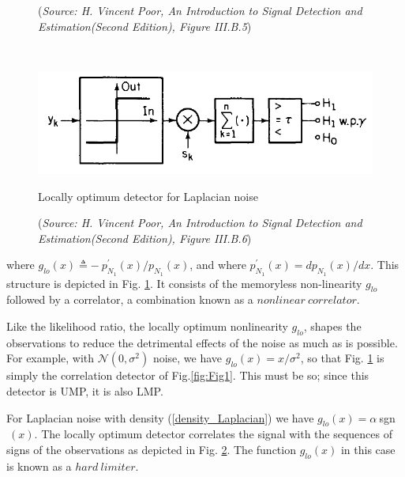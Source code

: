 \documentclass[a4paper,english,12pt]{article}
\begin{document}
\begin{exmp}
\begin{figure}[h]
\caption*{\footnotesize(\textit{Source: H. Vincent Poor, An Introduction to Signal Detection and Estimation(Second Edition), Figure	 III.B.5})}
\label{fig:Fig4}
\end{figure}\
\begin{figure}[h]
\centering
\captionsetup{justification=centering}
\includegraphics[width=0.8\linewidth]{Figures/lec10Fig5}
\caption{Locally optimum detector for Laplacian noise}
\caption*{\footnotesize(\textit{Source: H. Vincent Poor, An Introduction to Signal Detection and Estimation(Second Edition), Figure	 III.B.6})}
\label{fig:Fig5}
\end{figure}
where $g_{lo}(x)\triangleq-\ p_{N_{1}}^\prime(x)/p_{N_{1}}(x)$, and where $p_{N_{1}}^\prime(x)=dp_{N_{1}}(x)/dx$. This structure is depicted in  Fig. \ref{fig:Fig4}. It consists of the memoryless non-linearity $g_{lo}$ followed by a correlator, a combination known as a $nonlinear\ correlator$.
\par Like the likelihood ratio, the locally optimum nonlinearity $g_{lo}$, shapes the observations to reduce the detrimental effects of the noise as much as is possible. For example, with $\mathcal{N}(0,\sigma^2)$ noise, we have $g_{lo}(x)=x/\sigma^2$, so that  Fig. \ref{fig:Fig4} is simply the correlation detector of Fig.\ref{fig:Fig1}. This must be so; since this detector is UMP, it is also LMP.
\par For Laplacian noise with density (\ref{density_Laplacian}) we have $g_{lo}(x)=\alpha\ $sgn$\ (x)$. The locally optimum detector correlates the signal with the sequences of signs of the observations as depicted in Fig. \ref{fig:Fig5}. The function $g_{lo}(x)$ in this case is known as a $hard\ limiter$.
\end{exmp}
\end{document}
